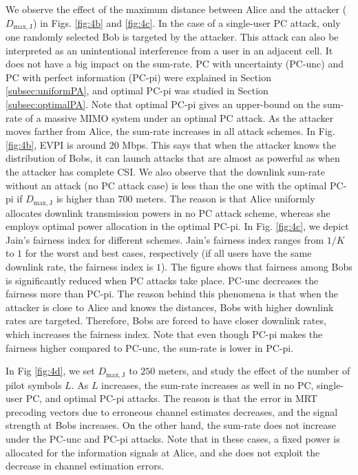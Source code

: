 \documentclass[draftclsnofoot, 12pt, onecolumn, journal]{IEEEtran}
\begin{document}
We observe the effect of the maximum distance between Alice and the attacker ($D_{\mathrm{max,J}}$) in Figs. \ref{fig:4b} and \ref{fig:4c}.
In the case of a single-user PC attack, only one randomly selected Bob is targeted by the attacker.
This attack can also be interpreted as an unintentional interference from a user in an adjacent cell.
It does not have a big impact on the sum-rate.
PC with uncertainty (PC-unc) and PC with perfect information (PC-pi) were explained in Section \ref{subsec:uniformPA}, and optimal PC-pi was studied in Section \ref{subsec:optimalPA}.
Note that optimal PC-pi gives an upper-bound on the sum-rate of a massive MIMO system under an optimal PC attack.
As the attacker moves farther from Alice, the sum-rate increases in all attack schemes.
In Fig. \ref{fig:4b}, EVPI is around $20$ Mbps.
This says that when the attacker knows the distribution of Bobs, it can launch attacks that are almost as powerful as when the attacker has complete CSI.
We also observe that the downlink sum-rate without an attack (no PC attack case) is less than the one with the optimal PC-pi if $D_{\mathrm{max,J}}$ is higher than $700$ meters.
The reason is that Alice uniformly allocates downlink transmission powers in no PC attack scheme, whereas she employs optimal power allocation in the optimal PC-pi.
In Fig. \ref{fig:4c}, we depict Jain's fairness index for different schemes.
Jain's fairness index ranges from $1/K$ to $1$ for the worst and best cases, respectively (if all users have the same downlink rate, the fairness index is $1$).
The figure shows that fairness among Bobs is significantly reduced when PC attacks take place.
PC-unc decreases the fairness more than PC-pi.
The reason behind this phenomena is that when the attacker is close to Alice and knows the distances, Bobs with higher downlink rates are targeted.
Therefore, Bobs are forced to have closer downlink rates, which increases the fairness index.
Note that even though PC-pi makes the fairness higher compared to PC-unc, the sum-rate is lower in PC-pi. 

In Fig \ref{fig:4d}, we set $D_{\mathrm{max,J}}$ to $250$ meters, and study the effect of the number of pilot symbols $L$.
As $L$ increases, the sum-rate increases as well in no PC, single-user PC, and optimal PC-pi attacks.
The reason is that the error in MRT precoding vectors due to erroneous channel estimates decreases, and the signal strength at Bobs increases.
On the other hand, the sum-rate does not increase under the PC-unc and PC-pi attacks.
Note that in these cases, a fixed power is allocated for the information signals at Alice, and she does not exploit the decrease in channel estimation errors.
\end{document}
